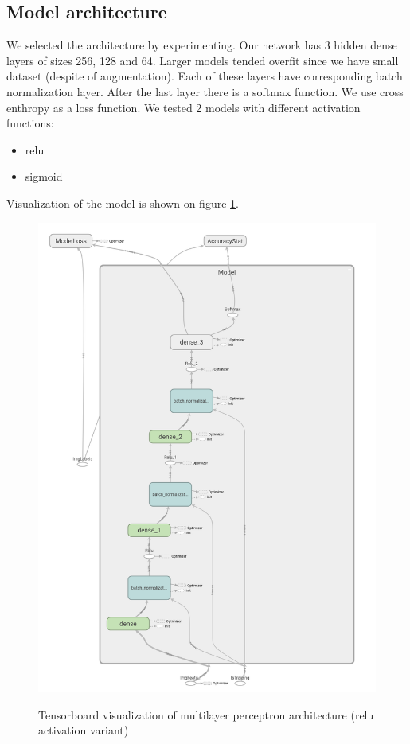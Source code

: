 \documentclass[a4paper]{article}
\begin{document}
\subsection{Model architecture}
We selected the architecture by experimenting.
Our network has 3 hidden dense layers of sizes 256, 128 and 64.
Larger models tended overfit since we have small dataset
(despite of augmentation).
Each of these layers have corresponding batch normalization layer.
After the last layer there is a softmax function.
We use cross enthropy as a loss function.
We tested 2 models with different activation functions:
\begin{itemize}
    \item relu
    \item sigmoid
\end{itemize}
Visualization of the model is shown on figure \ref{fig:arch}.

\begin{figure}[h]
    \caption[]{Tensorboard visualization of multilayer perceptron architecture (relu activation variant)}
    \centering
    \includegraphics[page=2,width=1.0\textwidth]{architecture.png}
    \label{fig:arch}
\end{figure}
\end{document}
